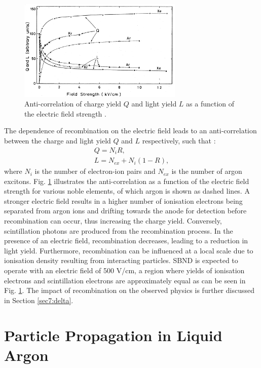 \begin{figure}[b!] 
\centering    
\includegraphics[width=0.70\textwidth]{QLAnti}
\caption[Charge and Light Yield as a Function of Electric Field]{
Anti-correlation of charge yield $Q$ and light yield $L$ as a function of the electric field strength \cite{QLAnti}.
}
\label{fig:QLAnti}
\end{figure}

The dependence of recombination on the electric field leads to an anti-correlation between the charge and light yield $Q$ and $L$ respectively, such that \cite{Lariat}:
\begin{gather}
        \label{eq:Q}
        Q = N_{i}R, \\ 
        \label{eq:L}
        L = N_{ex} + N_{i}(1 - R),
\end{gather}
where $N_{i}$ is the number of electron-ion pairs and $N_{ex}$ is the number of argon excitons.
Fig. \ref{fig:QLAnti} illustrates the anti-correlation as a function of the electric field strength for various noble elements, of which argon is shown as dashed lines.
A stronger electric field results in a higher number of ionisation electrons being separated from argon ions and drifting towards the anode for detection before recombination can occur, thus increasing the charge yield. 
Conversely, scintillation photons are produced from the recombination process.
In the presence of an electric field, recombination decreases, leading to a reduction in light yield.
Furthermore, recombination can be influenced at a local scale due to ionisation density resulting from interacting particles.
SBND is expected to operate with an electric field of 500 V/cm, a region where yields of ionisation electrons and scintillation electrons are approximately equal as can be seen in Fig. \ref{fig:QLAnti}.
The impact of recombination on the observed physics is further discussed in Section \ref{sec7:delta}.

\section{Particle Propagation in Liquid Argon}
\label{sec3:propagation}

